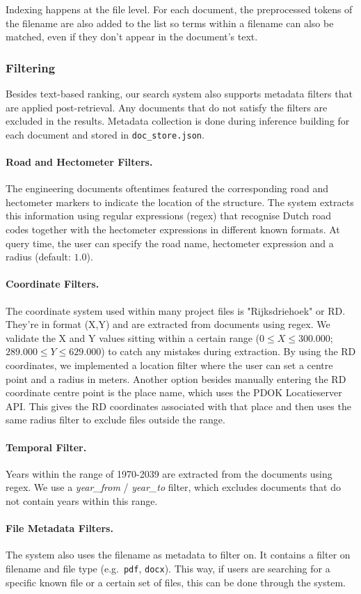 Indexing happens at the file level. For each document, the preprocessed tokens of the filename are also added to the list so terms within a filename can also be matched, even if they don't appear in the document's text.

\subsubsection{Filtering}
Besides text-based ranking, our search system also supports metadata filters that are applied post-retrieval. Any documents that do not satisfy the filters are excluded in the results. Metadata collection is done during inference building for each document and stored in \texttt{doc\_store.json}.

\paragraph{Road and Hectometer Filters.}
The engineering documents oftentimes featured the corresponding road and hectometer markers to indicate the location of the structure. The system extracts this information using regular expressions (regex) that recognise Dutch road codes together with the hectometer expressions in different known formats. At query time, the user can specify the road name, hectometer expression and a radius (default: $1.0$). 

\paragraph{Coordinate Filters.}
The coordinate system used within many project files is "Rijksdriehoek" or RD. They're in format (X,Y) and are extracted from documents using regex. We validate the X and Y values sitting within a certain range ($0 \leq X \leq 300{.}000$; $289{.}000 \leq Y \leq 629{.}000$) to catch any mistakes during extraction. By using the RD coordinates, we implemented a location filter where the user can set a centre point and a radius in meters. Another option besides manually entering the RD coordinate centre point is the place name, which uses the PDOK Locatieserver API. This gives the RD coordinates associated with that place and then uses the same radius filter to exclude files outside the range.

\paragraph{Temporal Filter.}
Years within the range of 1970-2039 are extracted from the documents using regex. We use a \textit{year\_from} / \textit{year\_to} filter, which excludes documents that do not contain years within this range.

\paragraph{File Metadata Filters.}
The system also uses the filename as metadata to filter on. It contains a filter on filename and file type (e.g.\ \texttt{pdf}, \texttt{docx}). This way, if users are searching for a specific known file or a certain set of files, this can be done through the system.


